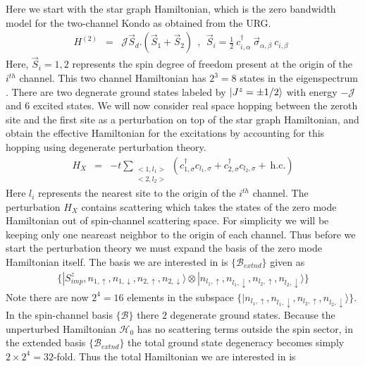 \documentclass[reprint,prb,superscriptaddress]{revtex4-2}
\begin{document}
\label{sec:eff_ham_2ch}
\noindent Here we start with the star graph Hamiltonian, which is the zero bandwidth model for the two-channel Kondo as obtained from the URG.
\begin{eqnarray}
H^{(2)}&=& {\mathcal{J}} \vec{S}_d.(\vec{S}_1+\vec{S}_2)~~,~~\vec{S}_i =  \frac{1}{2}~ c_{i,\alpha}^{\dagger}~ \vec{\sigma}_{\alpha,\beta}~ c_{i,\beta}~~
\label{eq:channel-2-spin}
\end{eqnarray}
Here, $\vec{S}_i=1,2$ represents the spin degree of freedom present at the origin of the $i^{th}$ channel. This two channel Hamiltonian has $2^3=8$ states in the eigenspectrum \cite{kunj_slal_1999}. There are two degnerate ground states labeled by $\ket{J^z=\pm 1/2}$ with energy $-\mathcal{J}$ and $6$ excited states.
We will now consider real space hopping between the zeroth site and the first site as a perturbation on top of the star graph Hamiltonian, and obtain the effective Hamiltonian for the excitations by accounting for this hopping using degenerate perturbation theory.
\begin{eqnarray}
H_{X} &=& -t \displaystyle\sum_{\substack{<1,l_1> \\ <2,l_2>}} (c^{\dagger}_{1,\sigma}c_{l_1,\sigma}+c^{\dagger}_{2,\sigma}c_{l_2,\sigma}+ ~\textrm{h.c.})
\end{eqnarray}
Here $l_i$ represents the nearest site to the origin of the $i^{th}$ channel. The perturbation $H_X$ contains scattering which takes the states of the zero mode Hamiltonian out of spin-channel scattering space. For simplicity we will be keeping only one neareast neighbor to the origin of each channel. Thus before we start the perturbation theory we must expand the basis of the zero mode Hamiltonian itself. The basis we are interested in is $\{\mathcal{B}_{extnd}\}$ given as 
\begin{eqnarray}
\{|S^z_{imp},n_{1,\uparrow},n_{1,\downarrow},n_{2,\uparrow},n_{2,\downarrow}\rangle \otimes |n_{l_1,\uparrow},n_{l_1,\downarrow},n_{l_2,\uparrow},n_{l_2,\downarrow}\rangle\} \nonumber
\end{eqnarray}
Note there are now $2^4=16$ elements in the subspace $\{|n_{l_1,\uparrow},n_{l_1,\downarrow},n_{l_2,\uparrow},n_{l_2,\downarrow}\rangle\}$. In the spin-channel basis $\{\mathcal{B}\}$ there $2$ degenerate ground states. Because the unperturbed Hamiltonian $\mathcal{H}_0$ has no scattering terms outside the spin sector, in the extended basis $\{\mathcal{B}_{extnd}\}$ the total ground state degeneracy becomes simply $2\times 2^4=32$-fold. Thus the total Hamiltonian we are interested in is 
\end{document}
